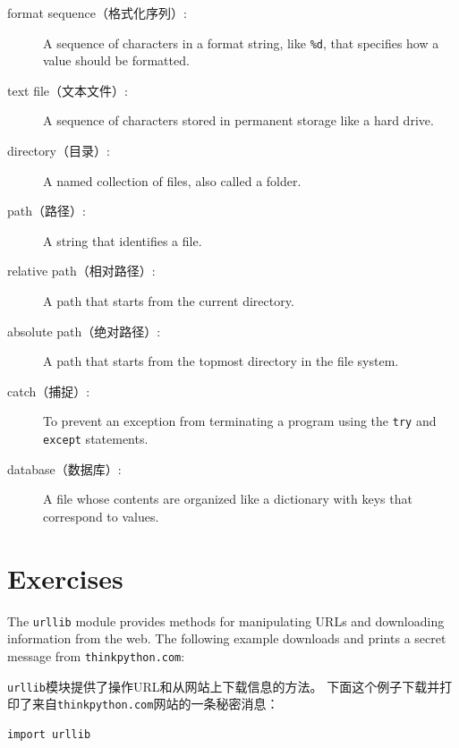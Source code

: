 \documentclass[10pt]{book}
\begin{document}
\begin{CJK}{UTF8}{gbsn}
\begin{description}
\item[format sequence（格式化序列）:] A sequence of characters in a format string,
like {\tt \%d}, that specifies how a value should be formatted.

\item[text file（文本文件）:] A sequence of characters stored in permanent
storage like a hard drive.

\item[directory（目录）:] A named collection of files, also called a folder.

\item[path（路径）:] A string that identifies a file.

\item[relative path（相对路径）:] A path that starts from the current directory.

\item[absolute path（绝对路径）:] A path that starts from the topmost directory
in the file system.

\item[catch（捕捉）:] To prevent an exception from terminating
a program using the {\tt try}
and {\tt except} statements.

\item[database（数据库）:] A file whose contents are organized like a dictionary
with keys that correspond to values.

\end{description}


\section{Exercises}

\begin{exercise}
\label{urllib}

The {\tt urllib} module provides methods for manipulating URLs
and downloading information from the web.  The following example
downloads and prints a secret message from {\tt thinkpython.com}:

{\tt urllib}模块提供了操作URL和从网站上下载信息的方法。
下面这个例子下载并打印了来自{\tt thinkpython.com}网站的一条秘密消息：

\begin{verbatim}
import urllib


\end{verbatim}
\end{exercise}
\end{CJK}
\end{document}
